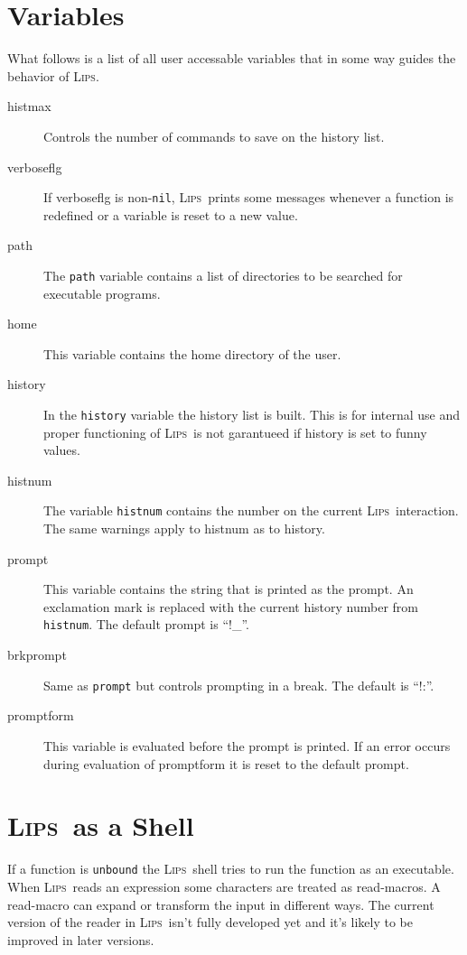 \documentclass[a4paper]{article}
\newcommand{\lips}{\textsc{Lips}}
\newcommand{\lisp}[1]{\texttt{#1}}
\newcommand{\NIL}{\lisp{nil}}
\begin{document}
\section{Variables}
What follows is a list of all user accessable variables that in some
way guides the behavior of \lips.
\begin{description}
\item[histmax] Controls the number of commands to save on the history
  list.
\item[verboseflg] If verboseflg is non-\NIL, \lips\ prints some
  messages whenever a function is redefined or a variable is reset to
  a new value.
\item[path] The \lisp{path} variable contains a list of directories to
  be searched for executable programs.
\item[home] This variable contains the home directory of the user.
\item[history] In the \lisp{history} variable the history list is
  built.  This is for internal use and proper functioning of \lips\ is
  not garantueed if history is set to funny values.
\item[histnum] The variable \lisp{histnum} contains the number on the
  current \lips\ interaction.  The same warnings apply to histnum as
  to history.
\item[prompt] This variable contains the string that is printed as the
  prompt.  An exclamation mark is replaced with the current history
  number from \lisp{histnum}.  The default prompt is ``!\_''.
\item[brkprompt] Same as \lisp{prompt} but controls prompting in a break.
  The default is ``!:''.
\item[promptform] This variable is evaluated before the prompt is
  printed.  If an error occurs during evaluation of promptform it is
  reset to the default prompt.
\end{description}

\section{\lips\ as a Shell}
If a function is \lisp{unbound} the \lips\ shell tries to run the
function as an executable.  When \lips\ reads an expression some
characters are treated as read-macros.  A read-macro can expand or
transform the input in different ways.  The current version of the
reader in \lips\ isn't fully developed yet and it's likely to be
improved in later versions.
\end{document}
